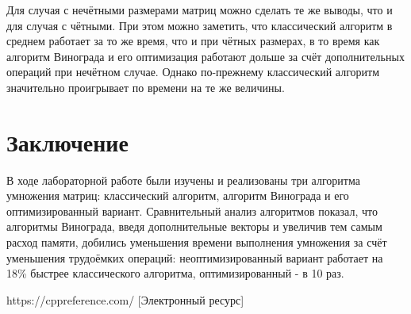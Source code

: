 \documentclass[12pt, a4paper]{report}
\begin{document}
 	Для случая с нечётными размерами матриц можно сделать те же выводы, что и для случая с чётными. При этом можно заметить, что классический алгоритм в среднем работает за то же время, что и при чётных размерах, в то время как алгоритм Винограда и его оптимизация работают дольше за счёт дополнительных операций при нечётном случае. Однако по-прежнему классический алгоритм значительно проигрывает по времени на те же величины.

	\chapter*{Заключение}
	В ходе лабораторной работе были изучены и реализованы три алгоритма умножения матриц: классический алгоритм, алгоритм Винограда и его оптимизированный вариант. Сравнительный анализ алгоритмов показал, что алгоритмы Винограда, введя дополнительные векторы и увеличив тем самым расход памяти, добились уменьшения времени выполнения умножения за счёт уменьшения трудоёмких операций: неоптимизированный вариант работает на 18\% быстрее классического алгоритма, оптимизированный - в 10 раз.
	
	\newpage
	
	\begin{thebibliography}{}
	 https://cppreference.com/ [Электронный ресурс]
	\end{thebibliography}
\end{document}
